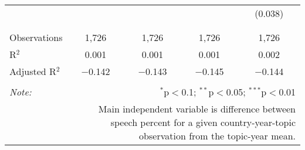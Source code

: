 \begin{table}[!htbp]
\begin{tabular}{@{\extracolsep{5pt}}lcccc}
  &  &  &  & (0.038) \\ 
  & & & & \\ 
\hline \\[-1.8ex] 
Observations & 1,726 & 1,726 & 1,726 & 1,726 \\ 
R$^{2}$ & 0.001 & 0.001 & 0.001 & 0.002 \\ 
Adjusted R$^{2}$ & $-$0.142 & $-$0.143 & $-$0.145 & $-$0.144 \\ 
\hline 
\hline \\[-1.8ex] 
\textit{Note:}  & \multicolumn{4}{r}{$^{*}$p$<$0.1; $^{**}$p$<$0.05; $^{***}$p$<$0.01} \\ 
 & \multicolumn{4}{r}{Main independent variable is difference between speech percent for a given country-year-topic observation from the topic-year mean.} \\ 
\end{tabular} 
\end{table} 

